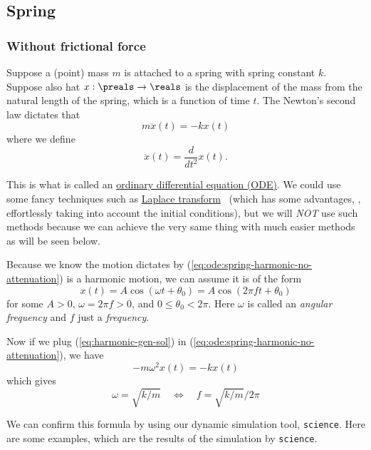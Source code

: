 \documentclass[12pt]{article}
\begin{document}
\subsection{Spring}

\subsubsection{Without frictional force}

Suppose a (point) mass $m$ is attached to a spring with spring constant $k$.
Suppose also hat $x:\preals\to\reals$ is the displacement of the mass from the natural length of the spring,
which is a function of time $t$.
The Newton's second law dictates that
\begin{equation}
\label{eq:ode:spring-harmonic-no-attenuation}
	m \ddot{x}(t)
	=
	-kx(t)
\end{equation}
where we define
\[
	\ddot{x}(t) = \frac{d}{dt^2} x(t).
\]

This is what is called an \href{https://en.wikipedia.org/wiki/Ordinary_differential_equation}{ordinary differential equation (ODE)}.
We could use some fancy techniques such as \href{https://en.wikipedia.org/wiki/Laplace_transform}{Laplace transform}~\cite{Laplace-transform}
(which has some advantages, \eg, effortlessly taking into account the initial conditions),
but we will \emph{NOT} use such methods
because we can achieve the very same thing with much easier methods as will be seen below.

Because we know the motion dictates by (\ref{eq:ode:spring-harmonic-no-attenuation}) is a harmonic motion,
we can assume it is of the form
\begin{equation}
\label{eq:harmonic-gen-sol}
	x(t) = A \cos(\omega t + \theta_0)
	= A \cos(2\pi f t + \theta_0)
\end{equation}
for some $A>0$, $\omega=2\pi f >0$, and $0\leq \theta_0 <2\pi$.
Here $\omega$ is called an \emph{angular frequency}
and $f$ just a \emph{frequency}.

Now if we plug (\ref{eq:harmonic-gen-sol}) in (\ref{eq:ode:spring-harmonic-no-attenuation}),
we have
\[
-m \omega^2 x(t) = - k x(t)
\]
which gives
\begin{equation}
\label{eq:freq-sol}
\omega = \sqrt{k/m}
\quad
\Leftrightarrow
\quad
f = \sqrt{k/m} / 2\pi
\end{equation}

We can confirm this formula by using our dynamic simulation tool, {\tt science}.
Here are some examples, which are the results of the simulation by {\tt science}.
\end{document}
